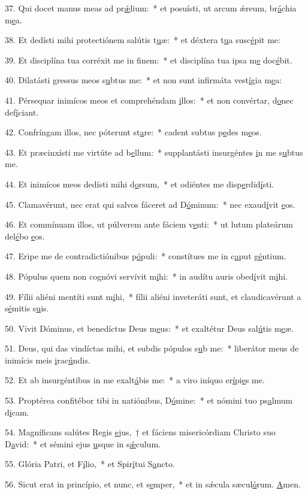 37. Qui docet manus meas ad pr\uline{ǽ}lium:~* et posuísti, ut arcum ǽreum, br\uline{á}chia m\uline{e}a.\par 
38. Et dedísti mihi protectiónem salútis t\uline{u}æ:~* et déxtera t\uline{u}a susc\uline{é}pit me:\par 
39. Et disciplína tua corréxit me in f\uline{i}nem:~* et disciplína tua ipsa m\uline{e} doc\uline{é}bit.\par 
40. Dilatásti gressus meos s\uline{u}btus me:~* et non sunt infirmáta vest\uline{í}gia m\uline{e}a:\par 
41. Pérsequar inimícos meos et comprehéndam \uline{i}llos:~* et non convértar, d\uline{o}nec def\uline{í}ciant.\par 
42. Confríngam illos, nec póterunt st\uline{a}re:~* cadent subtus p\uline{e}des m\uline{e}os.\par 
43. Et præcinxísti me virtúte ad b\uline{e}llum:~* supplantásti insurgéntes \uline{i}n me s\uline{u}btus me.\par 
44. Et inimícos meos dedísti mihi d\uline{o}rsum,~* et odiéntes me disp\uline{e}rdid\uline{í}sti.\par 
45. Clamavérunt, nec erat qui salvos fáceret ad D\uline{ó}minum:~* nec exaud\uline{í}vit \uline{e}os.\par 
46. Et commínuam illos, ut púlverem ante fáciem v\uline{e}nti:~* ut lutum plateárum del\uline{é}bo \uline{e}os.\par 
47. Eripe me de contradictiónibus p\uline{ó}puli:~* constítues me in c\uline{a}put g\uline{é}ntium.\par 
48. Pópulus quem non cognóvi servívit m\uline{i}hi:~* in audítu auris obed\uline{í}vit m\uline{i}hi.\par 
49. Fílii aliéni mentíti sunt m\uline{i}hi,~* fílii aliéni inveteráti sunt, et claudicavérunt a s\uline{é}mitis s\uline{u}is.\par 
50. Vivit Dóminus, et benedíctus Deus m\uline{e}us:~* et exaltétur Deus sal\uline{ú}tis m\uline{e}æ.\par 
51. Deus, qui das vindíctas mihi, et subdis pópulos s\uline{u}b me:~* liberátor meus de inimícis meis \uline{i}rac\uline{ú}ndis.\par 
52. Et ab insurgéntibus in me exalt\uline{á}bis me:~* a viro iníquo er\uline{í}pi\uline{e}s me.\par 
53. Proptérea confitébor tibi in natiónibus, D\uline{ó}mine:~* et nómini tuo ps\uline{a}lmum d\uline{i}cam.\par 
54. Magníficans salútes Regis \uline{e}jus,~† et fáciens misericórdiam Christo suo D\uline{a}vid:~* et sémini ejus \uline{u}sque in s\uline{ǽ}culum.\par 
55. Glória Patri, et F\uline{í}lio,~* et Spir\uline{í}tui S\uline{a}ncto.\par 
56. Sicut erat in princípio, et nunc, et s\uline{e}mper,~* et in sǽcula sæcul\uline{ó}rum. \uline{A}men.\par 
